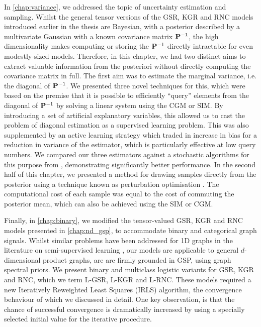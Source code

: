 In \cref{chap:variance}, we addressed the topic of uncertainty estimation and sampling. Whilst the general tensor versions of the GSR, KGR and RNC models introduced earlier in the thesis are Bayesian, with a posterior described by a multivariate Gaussian with a known covariance matrix $\mathbf{P}^{-1}$, the high dimensionality makes computing or storing the $\mathbf{P}^{-1}$ directly intractable for even modestly-sized models. Therefore, in this chapter, we had two distinct aims to extract valuable information from the posteriori without directly computing the covariance matrix in full. The first aim was to estimate the marginal variance, i.e. the diagonal of $\mathbf{P}^{-1}$. We presented three novel techniques for this, which were based on the premise that it is possible to efficiently ``query'' elements from the diagonal of $\mathbf{P}^{-1}$ by solving a linear system using the CGM or SIM. By introducing a set of artificial explanatory variables, this allowed us to cast the problem of diagonal estimation as a supervised learning problem. This was also supplemented by an active learning strategy which traded in increase in bias for a reduction in variance of the estimator, which is particularly effective at low query numbers. We compared our three estimators against a stochastic algorithms for this purpose from \cite{Bekas2007}, demonstrating significantly better performance. In the second half of this chapter, we presented a method for drawing samples directly from the posterior using a technique known as perturbation optimisation \citep{Orieux2012}. The computational cost of each sample was equal to the cost of commuting the posterior mean, which can also be achieved using the SIM or CGM. 

Finally, in \cref{chap:binary}, we modified the tensor-valued GSR, KGR and RNC models presented in \cref{chap:nd_gsp}, to accommodate binary and categorical graph signals. Whilst similar problems have been addressed for 1D graphs in the literature on semi-supervised learning \cite{Kondor2002,Zhu2003}, our models are applicable to general $d$-dimensional product graphs, are are firmly grounded in GSP, using graph spectral priors. We present binary and multiclass logistic variants for GSR, KGR and RNC, which we term L-GSR, L-KGR and L-RNC. These models required a new Iteratively Reweighted Least Squares (IRLS) algorithm, the convergence behaviour of which we discussed in detail. One key observation, is that the chance of successful convergence is dramatically increased by using a specially selected initial value for the iterative procedure.  


